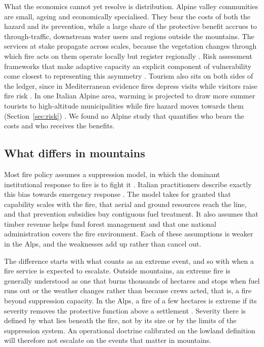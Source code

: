 \documentclass[11pt,a4paper]{article}
\begin{document}
What the economics cannot yet resolve is distribution. Alpine valley communities are small, ageing and economically specialised. They bear the costs of both the hazard and its prevention, while a large share of the protective benefit accrues to through-traffic, downstream water users and regions outside the mountains. The services at stake propagate across scales, because the vegetation changes through which fire acts on them operate locally but register regionally \citep{vukomanovic_systematic_2019}. Risk assessment frameworks that make adaptive capacity an explicit component of vulnerability come closest to representing this asymmetry \citep{riviere_mapping_2023, lecinadiaz_assessing_2021}. Tourism also sits on both sides of the ledger, since in Mediterranean evidence fires depress visits while visitors raise fire risk \citep{abrham_wildfires_2024}. In one Italian Alpine area, warming is projected to draw more summer tourists to high-altitude municipalities while fire hazard moves towards them (Section~\ref{sec:risk}) \citep{pede_mountain_2022}. We found no Alpine study that quantifies who bears the costs and who receives the benefits.

\subsection{What differs in mountains}

Most fire policy assumes a suppression model, in which the dominant institutional response to fire is to fight it \citep{moritz_learning_2014}. Italian practitioners describe exactly this bias towards emergency response \citep{kirschner_governance_2024}. The model takes for granted that capability scales with the fire, that aerial and ground resources reach the line, and that prevention subsidies buy contiguous fuel treatment. It also assumes that timber revenue helps fund forest management and that one national administration covers the fire environment. Each of these assumptions is weaker in the Alps, and the weaknesses add up rather than cancel out.

The difference starts with what counts as an extreme event, and so with when a fire service is expected to escalate. Outside mountains, an extreme fire is generally understood as one that burns thousands of hectares and stops when fuel runs out or the weather changes rather than because crews acted, that is, a fire beyond suppression capacity. In the Alps, a fire of a few hectares is extreme if its severity removes the protective function above a settlement \citep{muller_forest_2020}. Severity there is defined by what lies beneath the fire, not by its size or by the limits of the suppression system. An operational doctrine calibrated on the lowland definition will therefore not escalate on the events that matter in mountains.
\end{document}

